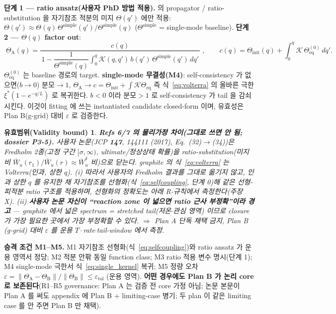 \documentclass[11pt,a4paper]{article}
\newtheorem*{boundbox}{유효범위(Validity bound)}
\newcommand{\eq}{\mathrm{eq}}
\newcommand{\simplecase}{\mathrm{simple}}
\begin{document}
\textbf{단계 1 — ratio ansatz(사용자 PhD 방법 적용).} \cite{lee2011,son2013} 의 propagator /
ratio-substitution 을 자기참조 적분의 미지 $\Theta(q')$ 에만 적용:
$\Theta(q')\approx\Theta(q)\,\Theta^\simplecase(q')/\Theta^\simplecase(q)$ ($\Theta^\simplecase$ =
single-mode baseline). \textbf{단계 2 — $\Theta(q)$ factor out}:
\begin{equation}
\boxed{\;\Theta_\mathrm A(q)=\frac{c(q)}
{\,1-\dfrac{1}{\Theta^\simplecase(q)}\displaystyle\int_0^q\mathcal K(q,q')\,b(q')\,\Theta^\simplecase(q')\,dq'\,}\;,
\qquad c(q)=\Theta_\mathrm{init}(q)+\int_0^q\mathcal K\,\Theta_\eq^{(0)}\,dq'.\;}
\label{eq:closed}
\end{equation}
$\Theta_\eq^{(0)}$ 는 baseline 경로의 target. \textbf{single-mode 무결성(M4)}: self-consistency 가
없으면($b\to0$) 분모$\to1$, $\Theta_\mathrm A\to c=\Theta_\mathrm{init}+\int\mathcal K\Theta_\eq$ 즉
식~\eqref{eq:volterra} 의 올바른 극한 $\xi^\ast(1-e^{-q/L})$ 로 복귀한다. $b<0$ 이라 분모$>1$ 로
self-consistency 가 tail 을 감쇠시킨다. 이것이 fitting 에 쓰는 instantiated candidate closed-form 이며,
유효성은 Plan B(g-grid) 대비 $\varepsilon$ 로 검증한다.
\begin{boundbox}
\textbf{Refs 6/7 의 물리가정 차이(그대로 쓰면 안 됨; dossier P3-5).} 사용자 논문(\emph{JCP} \textbf{147},
144111 (2017), Eq.\ (32)$\to$(34))은 \emph{Fredholm} 2종(고정 구간 $[\sigma,\infty)$, ultimate/정상상태
확률)을 ratio-substitution(미지 비 $\bar W_u(r_1)/\bar W_u(r)\approx\bar W_u^\delta$ 비)으로 닫는다.
graphite 의 식~\eqref{eq:volterra} 는 \emph{Volterra}(인과, 상한 $q$). (i) 따라서 사용자의 Fredholm
결과를 그대로 옮기지 않고, 인과 상한 $q$ 를 유지한 채 자기참조를 선형화(식~\eqref{eq:selfcoupling}, 단계 0)해
같은 선형-피적분 ratio 구조를 적용하며, 선형화의 정확도는 아래 R-규칙에서 \emph{측정}한다(주장 X).
(ii) \textbf{사용자 논문 자신이 ``reaction zone 이 넓으면 ratio 근사
부정확''이라 경고} — graphite 에서 \emph{넓은 spectrum = stretched tail(저온$\cdot$관심 영역)} 이므로
closure 가 가장 필요한 곳에서 가장 부정확할 수 있다. $\Rightarrow$ Plan A 단독 채택 금지, Plan B
(g-grid) 대비 $\varepsilon$ 를 운용 $T\cdot$rate$\cdot$tail-window 에서 측정.
\end{boundbox}
\textbf{승격 조건 M1--M5.} M1 자기참조 선형화(식~\eqref{eq:selfcoupling})와 ratio ansatz 가 운용 영역서 정당; M2 적분 안팎 동일 function class;
M3 ratio 적용 변수 명시(단계 1); M4 single-mode 극한서 식~\eqref{eq:single_kernel} 복귀; M5 정량 오차
$\varepsilon=\lVert\Theta_\mathrm A-\Theta_\mathrm B\rVert/\lVert\Theta_\mathrm B\rVert\le\varepsilon_\mathrm{tol}$
(운용 영역). \textbf{어떤 경우에도 Plan B 가 논리 core 로 보존된다}(R1--R5 governance: Plan A 는 검증 전
core 가정 아님; 논문 본문이 Plan A 를 써도 appendix 에 Plan B + limiting-case 병기; 두 plan 이 같은
limiting case 를 안 주면 Plan B 만 채택).
\end{document}
